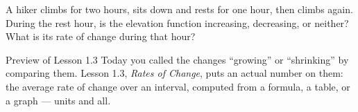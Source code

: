 \documentclass[10pt]{article}
\begin{document}
\vspace{0.1in}

\boxguard
\begin{extensionbox}
A hiker climbs for two hours, sits down and rests for one hour, then climbs
again. During the rest hour, is the elevation function increasing, decreasing,
or neither? What is its rate of change during that hour?

\vspace{0.05in}
\end{extensionbox}

\vspace{0.1in}

\boxguard
\begin{notesbox}{Preview of Lesson 1.3}
Today you called the changes ``growing'' or ``shrinking'' by comparing them.
Lesson 1.3, \textit{Rates of Change}, puts an actual number on them: the
average rate of change over an interval, computed from a formula, a table, or
a graph --- units and all.
\end{notesbox}
\end{document}
